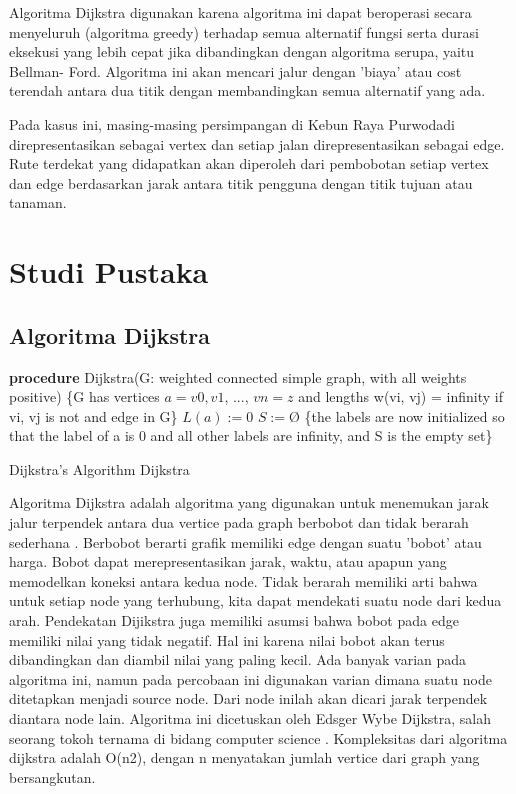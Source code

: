 \documentclass[conference]{IEEEtran}
\begin{document}
Algoritma Dijkstra digunakan karena algoritma ini dapat beroperasi secara menyeluruh (algoritma greedy) terhadap semua alternatif fungsi serta durasi eksekusi yang lebih cepat jika dibandingkan dengan algoritma serupa, yaitu Bellman- Ford. Algoritma ini akan mencari jalur dengan ’biaya’ atau cost terendah antara dua titik dengan membandingkan semua alternatif yang ada.

Pada kasus ini, masing-masing persimpangan di Kebun Raya Purwodadi direpresentasikan sebagai vertex dan setiap jalan direpresentasikan sebagai edge. Rute terdekat yang didapatkan akan diperoleh dari pembobotan setiap vertex dan edge berdasarkan jarak antara titik pengguna dengan titik tujuan atau tanaman.

\section{Studi Pustaka}
\subsection{Algoritma Dijkstra}
\begin{algorithm}
\DontPrintSemicolon
{}
{\bf procedure} Dijkstra(G: weighted connected simple graph, with all weights positive)\;
\{G has vertices $a = v0, v1$, ..., $vn = z$ and lengths w(vi, vj) = infinity if vi, vj is not and edge in G\}\;
$L(a) := 0$\;
$S := Ø$\;
\{the labels are now initialized so that the label of a is 0 and all other labels are infinity, and S is the empty set\}\;
\caption{Dijkstra's Algorithm Dijkstra\label{IR}}
\end{algorithm}

Algoritma Dijkstra adalah algoritma yang digunakan untuk menemukan jarak jalur terpendek antara dua vertice pada graph berbobot dan tidak berarah sederhana \cite{book1}. Berbobot berarti grafik memiliki edge dengan suatu ’bobot’ atau harga. Bobot dapat merepresentasikan jarak, waktu, atau apapun yang memodelkan koneksi antara kedua node. Tidak berarah memiliki arti bahwa untuk setiap node yang terhubung, kita dapat mendekati suatu node dari kedua arah. Pendekatan Dijikstra juga memiliki asumsi bahwa bobot pada edge memiliki nilai yang tidak negatif. Hal ini karena nilai bobot akan terus dibandingkan dan diambil nilai yang paling kecil. Ada banyak varian pada algoritma ini, namun pada percobaan ini digunakan varian dimana suatu node ditetapkan menjadi source node. Dari node inilah akan dicari jarak terpendek diantara node lain. Algoritma ini dicetuskan oleh Edsger Wybe Dijkstra, salah seorang tokoh ternama di bidang computer science \cite{book2}. Kompleksitas dari algoritma dijkstra adalah O(n2), dengan n menyatakan jumlah vertice dari graph yang bersangkutan.
\end{document}
